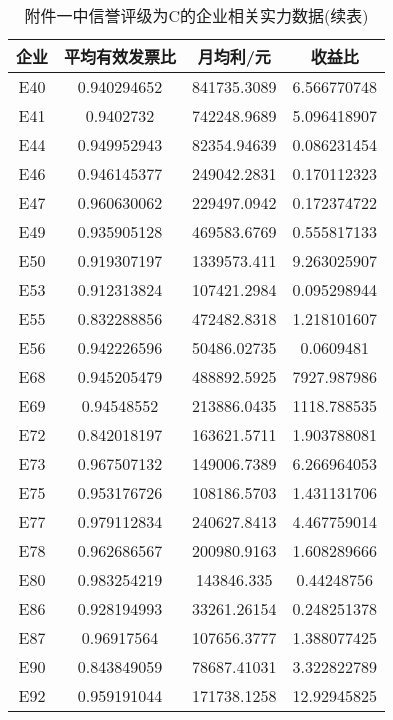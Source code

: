 \documentclass{cumcmthesis}
\begin{document}
\begin{appendices}
\begin{table}[H]   %
	\caption{附件一中信誉评级为C的企业相关实力数据(续表)}\label{tab:008} \centering
	\begin{tabular}{cccc}
		\toprule[1.5pt]
		企业 & 平均有效发票比     & 月均利/元           & 收益比          \\
		\midrule[1pt]
E40  & 0.940294652 & 841735.3089 & 6.566770748  \\
E41  & 0.9402732   & 742248.9689 & 5.096418907  \\
E44  & 0.949952943 & 82354.94639 & 0.086231454  \\
E46  & 0.946145377 & 249042.2831 & 0.170112323  \\
E47  & 0.960630062 & 229497.0942 & 0.172374722  \\
E49  & 0.935905128 & 469583.6769 & 0.555817133  \\
E50  & 0.919307197 & 1339573.411 & 9.263025907  \\
E53  & 0.912313824 & 107421.2984 & 0.095298944  \\
E55  & 0.832288856 & 472482.8318 & 1.218101607  \\
E56  & 0.942226596 & 50486.02735 & 0.0609481    \\
E68  & 0.945205479 & 488892.5925 & 7927.987986  \\
E69  & 0.94548552  & 213886.0435 & 1118.788535  \\
E72  & 0.842018197 & 163621.5711 & 1.903788081  \\
E73  & 0.967507132 & 149006.7389 & 6.266964053  \\
E75  & 0.953176726 & 108186.5703 & 1.431131706  \\
E77  & 0.979112834 & 240627.8413 & 4.467759014  \\
E78  & 0.962686567 & 200980.9163 & 1.608289666  \\
E80  & 0.983254219 & 143846.335  & 0.44248756   \\
E86  & 0.928194993 & 33261.26154 & 0.248251378  \\
E87  & 0.96917564  & 107656.3777 & 1.388077425  \\
E90  & 0.843849059 & 78687.41031 & 3.322822789  \\
E92  & 0.959191044 & 171738.1258 & 12.92945825  \\
		\bottomrule[1.5pt]
\end{tabular}
\end{table}


\end{appendices}
\end{document}

